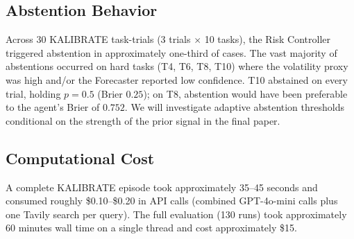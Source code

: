 \documentclass{article} %
\newcommand{\agentname}{KALIBRATE}
\begin{document}
\subsection{Abstention Behavior}

Across 30 \agentname{} task-trials (3 trials $\times$ 10 tasks), the Risk Controller triggered abstention in approximately one-third of cases. The vast majority of abstentions occurred on hard tasks (T4, T6, T8, T10) where the volatility proxy was high and/or the Forecaster reported low confidence. T10 abstained on every trial, holding $p=0.5$ (Brier $0.25$); on T8, abstention would have been preferable to the agent's Brier of $0.752$. We will investigate adaptive abstention thresholds conditional on the strength of the prior signal in the final paper.

\subsection{Computational Cost}

A complete \agentname{} episode took approximately 35--45 seconds and consumed roughly \$0.10--\$0.20 in API calls (combined GPT-4o-mini calls plus one Tavily search per query). The full evaluation (130 runs) took approximately 60 minutes wall time on a single thread and cost approximately \$15.
\end{document}
